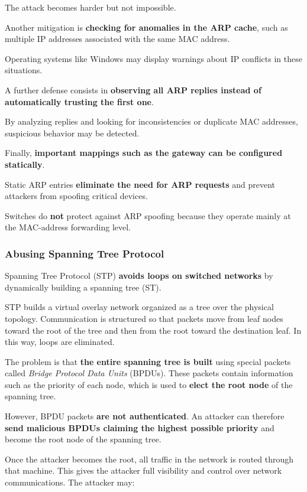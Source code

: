 \documentclass{article}
\begin{document}
The attack becomes harder but not impossible.

Another mitigation is \textbf{checking for anomalies in the ARP cache}, such as multiple IP addresses associated with the same MAC address.

Operating systems like Windows may display warnings about IP conflicts in these situations.

A further defense consists in \textbf{observing all ARP replies instead of automatically trusting the first one}.

By analyzing replies and looking for inconsistencies or duplicate MAC addresses, suspicious behavior may be detected.

Finally, \textbf{important mappings such as the gateway can be configured statically}.

Static ARP entries \textbf{eliminate the need for ARP requests} and prevent attackers from spoofing critical devices.

Switches do \textbf{not} protect against ARP spoofing because they operate mainly at the MAC-address forwarding level.

\subsubsection{Abusing Spanning Tree Protocol}

Spanning Tree Protocol (STP) \textbf{avoids loops on switched networks} by dynamically building a spanning tree (ST).

STP builds a virtual overlay network organized as a tree over the physical topology. Communication is structured so that packets move from leaf nodes toward the root of the tree and then from the root toward the destination leaf. In this way, loops are eliminated.

The problem is that \textbf{the entire spanning tree is built} using special packets called \textit{Bridge Protocol Data Units} (BPDUs). These packets contain information such as the priority of each node, which is used to \textbf{elect the root node} of the spanning tree.

However, BPDU packets \textbf{are not authenticated}. An attacker can therefore \textbf{send malicious BPDUs claiming the highest possible priority} and become the root node of the spanning tree.

Once the attacker becomes the root, all traffic in the network is routed through that machine. This gives the attacker full visibility and control over network communications. The attacker may:
\end{document}

